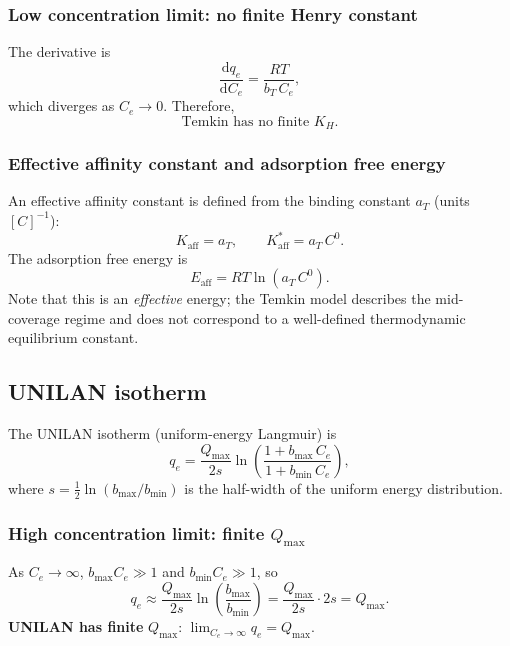 \documentclass[journal=aamick,manuscript=article]{achemso}
\begin{document}
\subsubsection{Low concentration limit: no finite Henry constant}

The derivative is
\begin{equation}
	\frac{\mathrm{d}q_e}{\mathrm{d}C_e} = \frac{RT}{b_T\, C_e},
\end{equation}
which diverges as $C_e \to 0$. Therefore,
\begin{equation}
	\boxed{\text{Temkin has no finite } K_H.}
\end{equation}

\subsubsection{Effective affinity constant and adsorption free energy}

An effective affinity constant is defined from the binding constant $a_T$ (units $[C]^{-1}$):
\begin{equation}
	K_{\mathrm{aff}} = a_T,
	\qquad
	K_{\mathrm{aff}}^{\ast} = a_T\, C^0.
\end{equation}
The adsorption free energy is
\begin{equation}
	\boxed{
		E_{\mathrm{aff}} = RT\ln(a_T\, C^0).
	}
\end{equation}
Note that this is an \emph{effective} energy; the Temkin model describes the mid-coverage regime and does not correspond to a well-defined thermodynamic equilibrium constant.

\subsection{UNILAN isotherm}
\label{sec:si_unilan}

The UNILAN isotherm (uniform-energy Langmuir) is
\begin{equation}
	q_e = \frac{Q_{\max}}{2s}
	\ln\!\left(
	\frac{1 + b_{\max}\, C_e}{1 + b_{\min}\, C_e}
	\right),
	\label{eq:si_unilan}
\end{equation}
where $s = \tfrac{1}{2}\ln(b_{\max}/b_{\min})$ is the half-width of the uniform energy distribution.

\subsubsection{High concentration limit: finite $Q_{\max}$}

As $C_e \to \infty$, $b_{\max}C_e \gg 1$ and $b_{\min}C_e \gg 1$, so
\begin{equation}
	q_e \approx \frac{Q_{\max}}{2s}
	\ln\!\left(\frac{b_{\max}}{b_{\min}}\right)
	= \frac{Q_{\max}}{2s} \cdot 2s = Q_{\max}.
\end{equation}
\textbf{UNILAN has finite }$Q_{\max}$:\quad
$\displaystyle \lim_{C_e \to \infty} q_e = Q_{\max}$.
\end{document}
